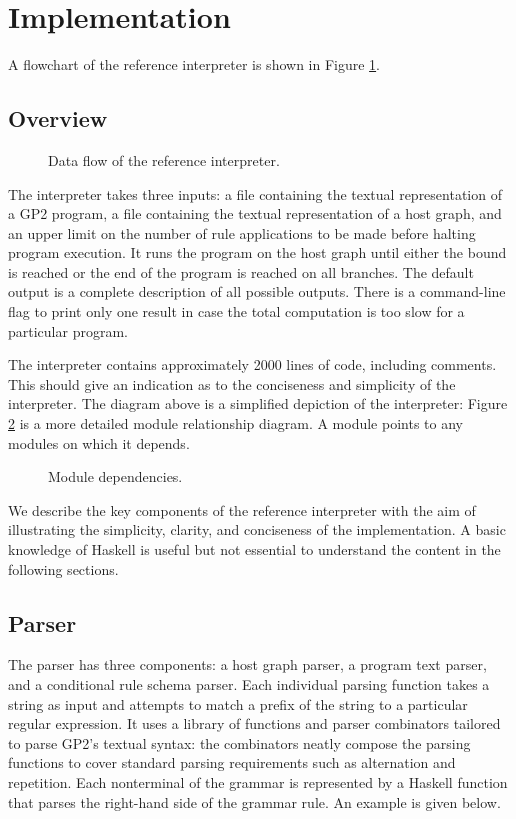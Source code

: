 \section{Implementation}

A flowchart of the reference interpreter is shown in Figure \ref{fig:architecture}.
\subsection{Overview}

\begin{figure}
\centering

\caption{Data flow of the reference interpreter.} \label{fig:architecture}
\end{figure}

The interpreter takes three inputs: a file containing the textual representation of a GP2 program, a file containing the textual representation of a host graph, and an upper limit on the number of rule applications to be made before halting program execution. It runs the program on the host graph until either the bound is reached or the end of the program is reached on all branches. The default output is a complete description of all possible outputs. There is a command-line flag to print only one result in case the total computation is too slow for a particular program.

The interpreter contains approximately 2000 lines of code, including comments. This should give an indication as to the conciseness and simplicity of the interpreter. The diagram above is a simplified depiction of the interpreter: Figure \ref{fig:modules} is a more detailed module relationship diagram. A module points to any modules on which it depends. 

\begin{figure}
\centering

\caption{Module dependencies.} \label{fig:modules}
\end{figure}

We describe the key components of the reference interpreter with the aim of illustrating the simplicity, clarity, and conciseness of the implementation. A basic knowledge of Haskell is useful but not essential to understand the content in the following sections.

\subsection{Parser}
The parser has three components: a host graph parser, a program text parser, and a conditional rule schema parser. Each individual parsing function takes a string as input and attempts to match a prefix of the string to a particular regular expression. It uses a library of functions and parser combinators tailored to parse GP2's textual syntax: the combinators neatly compose the parsing functions to cover standard parsing requirements such as alternation and repetition. Each nonterminal of the grammar is represented by a Haskell function that parses the right-hand side of the grammar rule. An example is given below.

